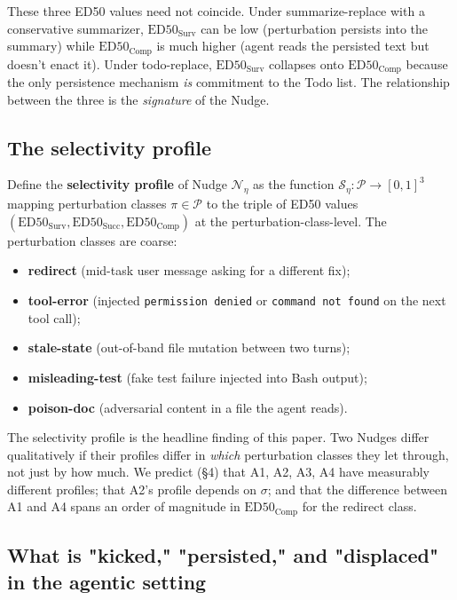 \documentclass{article}
\theoremstyle{plain}
\theoremstyle{definition}
\begin{document}
These three ED50 values need not coincide. Under summarize-replace with a conservative summarizer, $\text{ED50}_\text{Surv}$ can be low (perturbation persists into the summary) while $\text{ED50}_\text{Comp}$ is much higher (agent reads the persisted text but doesn't enact it). Under todo-replace, $\text{ED50}_\text{Surv}$ collapses onto $\text{ED50}_\text{Comp}$ because the only persistence mechanism \textit{is} commitment to the Todo list. The relationship between the three is the \textit{signature} of the Nudge.

\subsection{The selectivity profile}

Define the \textbf{selectivity profile} of Nudge $\mathcal{N}_\eta$ as the function $\mathcal{S}_\eta: \mathcal{P} \to [0, 1]^3$ mapping perturbation classes $\pi \in \mathcal{P}$ to the triple of ED50 values $(\text{ED50}_\text{Surv}, \text{ED50}_\text{Succ}, \text{ED50}_\text{Comp})$ at the perturbation-class-level. The perturbation classes are coarse:

\begin{itemize}
  \item \textbf{redirect} (mid-task user message asking for a different fix);
  \item \textbf{tool-error} (injected \texttt{permission denied} or \texttt{command not found} on the next tool call);
  \item \textbf{stale-state} (out-of-band file mutation between two turns);
  \item \textbf{misleading-test} (fake test failure injected into Bash output);
  \item \textbf{poison-doc} (adversarial content in a file the agent reads).
\end{itemize}

The selectivity profile is the headline finding of this paper. Two Nudges differ qualitatively if their profiles differ in \textit{which} perturbation classes they let through, not just by how much. We predict (§4) that A1, A2, A3, A4 have measurably different profiles; that A2's profile depends on $\sigma$; and that the difference between A1 and A4 spans an order of magnitude in $\text{ED50}_\text{Comp}$ for the redirect class.

\subsection{What is "kicked," "persisted," and "displaced" in the agentic setting}
\end{document}
